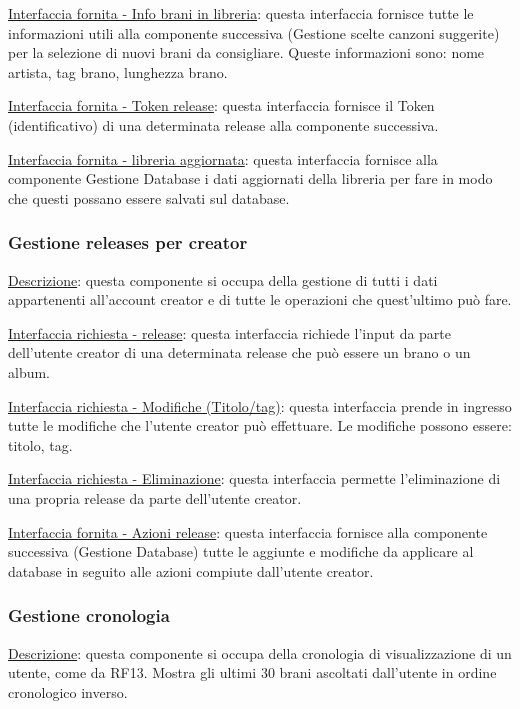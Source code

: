 \documentclass[a4paper,12pt]{article}
\begin{document}
\underline{Interfaccia fornita - Info brani in libreria}: questa interfaccia fornisce tutte le informazioni utili alla componente successiva (Gestione scelte canzoni suggerite) per la selezione di nuovi brani da consigliare. Queste informazioni sono: nome artista, tag brano, lunghezza brano.

\underline{Interfaccia fornita - Token release}: questa interfaccia fornisce il Token (identificativo) di una determinata release alla componente successiva.

\underline{Interfaccia fornita - libreria aggiornata}: questa interfaccia fornisce alla componente Gestione Database i dati aggiornati della libreria per fare in modo che questi possano essere salvati sul database.

\subsubsection{Gestione releases per creator}

\underline{Descrizione}: questa componente si occupa della gestione di tutti i dati appartenenti all’account creator e di tutte le operazioni che quest’ultimo può fare.

\underline{Interfaccia richiesta - release}: questa interfaccia richiede l’input da parte dell’utente creator di una determinata release che può essere un brano o un album. 

\underline{Interfaccia richiesta - Modifiche (Titolo/tag)}: questa interfaccia prende in ingresso tutte le modifiche che l’utente creator può effettuare. Le modifiche possono essere: titolo, tag.

\underline{Interfaccia richiesta - Eliminazione}: questa interfaccia permette l’eliminazione di una propria release da parte dell’utente creator.

\underline{Interfaccia fornita - Azioni release}: questa interfaccia fornisce alla componente successiva (Gestione Database) tutte le aggiunte e modifiche da applicare al database in seguito alle azioni compiute dall’utente creator.

\subsubsection{Gestione cronologia}

\underline{Descrizione}: questa componente si occupa della cronologia di visualizzazione di un utente, come da RF13. Mostra gli ultimi 30 brani ascoltati dall’utente in ordine cronologico inverso.
\end{document}
